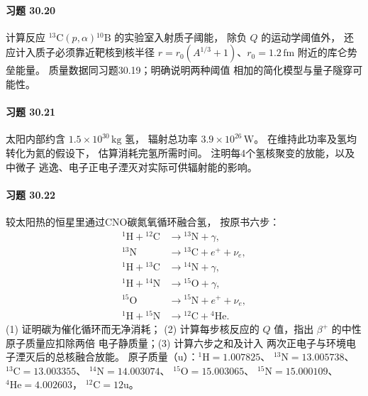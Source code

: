 \paragraph{习题 30.20}
计算反应
\({}^{13}\mathrm C(p,\alpha){}^{10}\mathrm B\)
的实验室入射质子阈能，
除负 \(Q\) 的运动学阈值外，
还应计入质子必须靠近靶核到核半径
\(r=r_0(A^{1/3}+1)\)、\(r_0=1.2\,\mathrm{fm}\)
附近的库仑势垒能量。
质量数据同习题30.19；明确说明两种阈值
相加的简化模型与量子隧穿可能性。
\paragraph{习题 30.21}
太阳内部约含
\(1.5\times10^{30}\,\mathrm{kg}\) 氢，
辐射总功率 \(3.9\times10^{26}\,\mathrm W\)。
在维持此功率及氢均转化为氦的假设下，
估算消耗完氢所需时间。
注明每4个氢核聚变的放能，以及中微子
逃逸、电子正电子湮灭对实际可供辐射能的影响。
\paragraph{习题 30.22}
较太阳热的恒星里通过CNO碳氮氧循环融合氢，
按原书六步：
\[
\begin{aligned}
{}^{1}\mathrm H+{}^{12}\mathrm C&\to{}^{13}\mathrm N+\gamma,\\
{}^{13}\mathrm N&\to{}^{13}\mathrm C+e^++\nu_e,\\
{}^{1}\mathrm H+{}^{13}\mathrm C&\to{}^{14}\mathrm N+\gamma,\\
{}^{1}\mathrm H+{}^{14}\mathrm N&\to{}^{15}\mathrm O+\gamma,\\
{}^{15}\mathrm O&\to{}^{15}\mathrm N+e^++\nu_e,\\
{}^{1}\mathrm H+{}^{15}\mathrm N&\to{}^{12}\mathrm C+{}^{4}\mathrm{He}.
\end{aligned}
\]
(1) 证明碳为催化循环而无净消耗；
(2) 计算每步核反应的 \(Q\) 值，指出
\(\beta^+\) 的中性原子质量应扣除两倍
电子静质量；(3) 计算六步之和及计入
两次正电子与环境电子湮灭后的总核融合放能。
原子质量（u）：\({}^{1}\mathrm H=1.007825\)、
\({}^{13}\mathrm N=13.005738\)、
\({}^{13}\mathrm C=13.003355\)、
\({}^{14}\mathrm N=14.003074\)、
\({}^{15}\mathrm O=15.003065\)、
\({}^{15}\mathrm N=15.000109\)、
\({}^{4}\mathrm{He}=4.002603\)，
\({}^{12}\mathrm C=12\)u。
